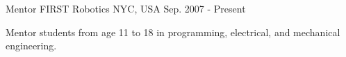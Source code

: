 
\begin{cventries}
  \cventry
    {Mentor} %
    {FIRST Robotics} %
    {NYC, USA} %
    {Sep. 2007 - Present} %
    {
        \begin{cvitems}
            \item {Mentor students from age 11 to 18 in programming, electrical, and mechanical engineering.}
        \end{cvitems}
    }
\end{cventries}
